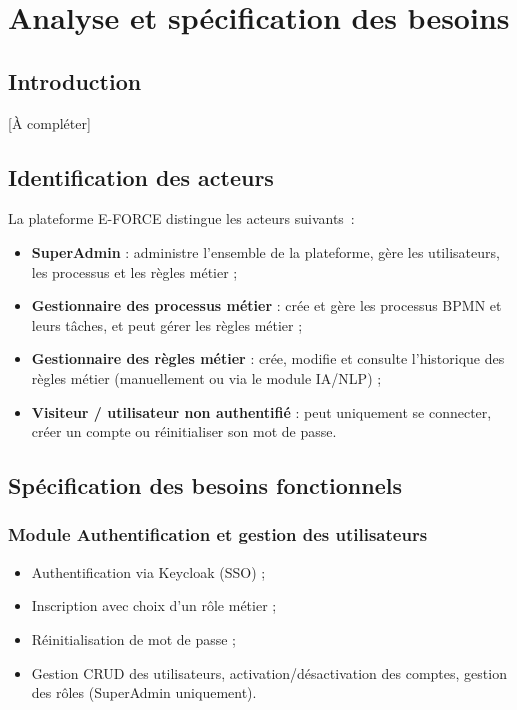 \chapter{Analyse et sp\'ecification des besoins}
\label{chap:analyse}

\section{Introduction}

[\`A compl\'eter]

\section{Identification des acteurs}

La plateforme E-FORCE distingue les acteurs suivants~:

\begin{itemize}
    \item \textbf{SuperAdmin} : administre l'ensemble de la plateforme,
    g\`ere les utilisateurs, les processus et les r\`egles m\'etier ;
    \item \textbf{Gestionnaire des processus m\'etier} : cr\'ee et g\`ere les
    processus BPMN et leurs t\^aches, et peut g\'erer les r\`egles m\'etier ;
    \item \textbf{Gestionnaire des r\`egles m\'etier} : cr\'ee, modifie et
    consulte l'historique des r\`egles m\'etier (manuellement ou via le
    module IA/NLP) ;
    \item \textbf{Visiteur / utilisateur non authentifi\'e} : peut
    uniquement se connecter, cr\'eer un compte ou r\'einitialiser son mot
    de passe.
\end{itemize}

\section{Sp\'ecification des besoins fonctionnels}

\subsection{Module Authentification et gestion des utilisateurs}
\begin{itemize}
    \item Authentification via Keycloak (SSO) ;
    \item Inscription avec choix d'un r\^ole m\'etier ;
    \item R\'einitialisation de mot de passe ;
    \item Gestion CRUD des utilisateurs, activation/d\'esactivation des
    comptes, gestion des r\^oles (SuperAdmin uniquement).
\end{itemize}

